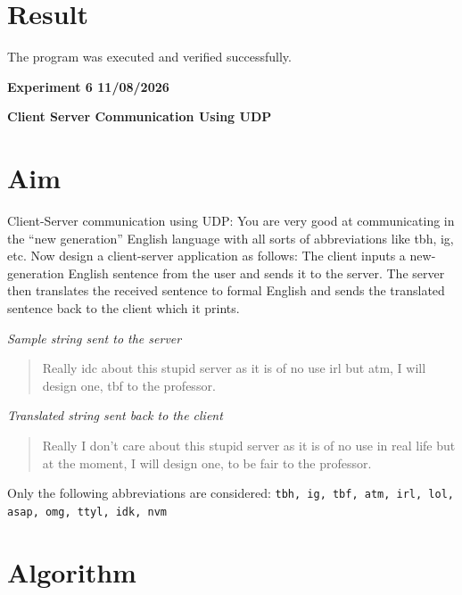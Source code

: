 \documentclass[12pt, a4paper]{report}
\begin{document}
\section*{Result}
The program was executed and verified successfully.

\newpage 
\begin{center}
	\bfseries 
	Experiment 6 \hfill 11/08/2026
\end{center}
\label{exp:6}
\begin{center}
	{\bfseries \Huge Client Server Communication Using UDP \par}
\end{center}

\section*{Aim}

Client-Server communication using UDP: You are very good at communicating in the
``new generation'' English language with all sorts of abbreviations like tbh, ig, etc. Now
design a client-server application as follows: The client inputs a new-generation English
sentence from the user and sends it to the server. The server then translates the received
sentence to formal English and sends the translated sentence back to the client which it
prints.

\textit{Sample string sent to the server}

\begin{quote}
	\ttfamily
	Really idc about this stupid server as it is of no use irl but atm,
	I will design one, tbf to the professor.
\end{quote}

\textit{Translated string sent back to the client}
\begin{quote}
	\ttfamily
	Really I don't care about this stupid server as it is of no use in
	real life but at the moment, I will design one, to be fair to the
	professor.
\end{quote}

Only the following abbreviations are considered:
\texttt{tbh, ig, tbf, atm, irl, lol, asap, omg, ttyl, idk, nvm}

\section*{Algorithm}
\end{document}

